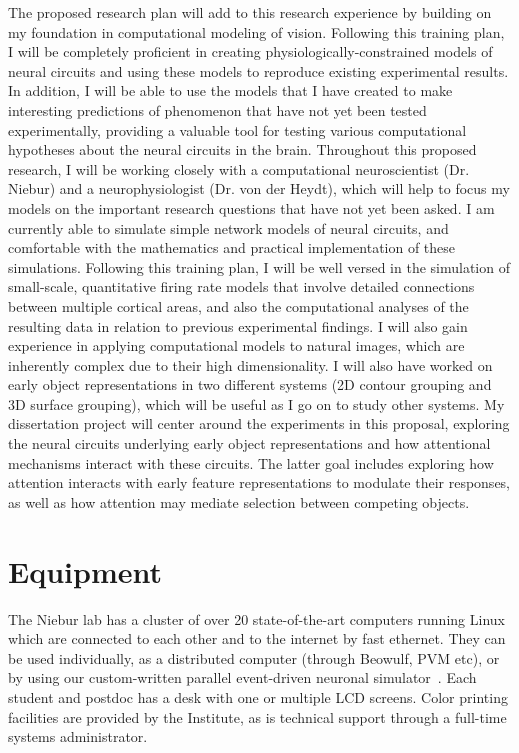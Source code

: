 \documentclass[11pt,notitlepage]{article}
\begin{document}
The proposed research plan will add to this research experience by building on my foundation in computational modeling of vision. Following this training plan, I will be completely proficient in creating physiologically-constrained models of neural circuits and using these models to reproduce existing experimental results. In addition, I will be able to use the models that I have created to make interesting predictions of phenomenon that have not yet been tested experimentally, providing a valuable tool for testing various computational hypotheses about the neural circuits in the brain. Throughout this proposed research, I will be working closely with a computational neuroscientist (Dr. Niebur) and a neurophysiologist (Dr. von der Heydt), which will help to focus my models on the important research questions that have not yet been asked. I am currently able to simulate simple network models of neural circuits, and comfortable with the mathematics and practical implementation of these simulations. Following this training plan, I will be well versed in the simulation of small-scale, quantitative firing rate models that involve detailed connections between multiple cortical areas, and also the computational analyses of the resulting data in relation to previous experimental findings. I will also gain experience in applying computational models to natural images, which are inherently complex due to their high dimensionality. I will also have worked on early object representations in two different systems (2D contour grouping and 3D surface grouping), which will be useful as I go on to study other systems. My dissertation project will center around the experiments in this proposal, exploring the neural circuits underlying early object representations and how attentional mechanisms interact with these circuits. The latter goal includes exploring how attention interacts with early feature representations to modulate their responses, as well as how attention may mediate selection between competing objects.

\clearpage

\section*{Equipment}

The Niebur lab has a cluster of over 20 state-of-the-art computers running Linux which are connected to each other and to the internet by fast ethernet. They can be used individually, as a distributed computer (through Beowulf, PVM etc), or by using our custom-written parallel event-driven neuronal simulator~\citep{Mihalas_etal11a}. Each student and postdoc has a desk with one or multiple LCD screens. Color printing facilities are provided by the Institute, as is technical support through a full-time systems administrator.
\end{document}
